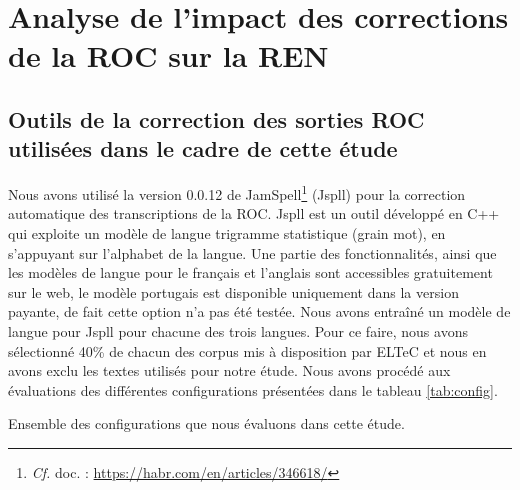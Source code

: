 
\section{Analyse de l'impact des corrections de la ROC sur la REN}
\label{sec:COR-OCR-IMPACT-NER}

\subsection{Outils de la correction des sorties ROC utilisées dans le cadre de cette étude}
\label{subsec:outils_COR-OCR-IMPACT-NER}
Nous avons utilisé la version 0.0.12 de JamSpell\footnote{\textit{Cf.} doc. : \url{https://habr.com/en/articles/346618/}} (Jspll) pour la correction automatique des transcriptions de la ROC. Jspll est un outil développé en C++ qui exploite un modèle de langue trigramme statistique
 (grain mot), en s'appuyant sur l'alphabet de la langue. Une partie des fonctionnalités, ainsi que les modèles de langue pour le français et l'anglais sont accessibles gratuitement sur le web, le modèle portugais est disponible uniquement dans la version payante, de fait cette option n'a pas été testée.
Nous avons entraîné un modèle de langue pour Jspll pour chacune des trois langues. Pour ce faire, nous avons sélectionné 40\% de chacun des corpus mis à disposition par ELTeC
 et nous en avons exclu les textes utilisés pour notre étude. Nous avons procédé aux évaluations des différentes configurations présentées dans le tableau \ref{tab:config}.

\begin{table}[h!]
    \centering
   
    \caption{Ensemble des configurations que nous évaluons dans cette étude. }
    \label{tab:config}
\end{table}


